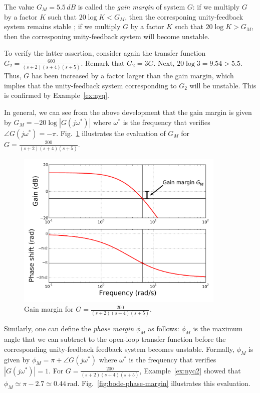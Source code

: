 \documentclass[a4paper,11pt]{report}
\theoremstyle{definition}
\begin{document}
The value $G_M=5.5\,dB$ is called the \emph{gain margin} of system
$G$: if we multiply $G$ by a factor $K$ such that $20\log K<G_M$, then
the corresponing unity-feedback system remains stable ; if we multiply
$G$ by a factor $K$ such that $20\log K>G_M$, then the corresponing
unity-feedback system will become unstable. 

To verify the latter assertion, consider again the transfer function
$G_2=\frac{600}{(s+2)(s+4)(s+5)}$. Remark that $G_2=3G$. Next, $20\log
3=9.54>5.5$. Thus, $G$ has been increased by a factor larger than the
gain margin, which implies that the unity-feedback system
corresponding to $G_2$ will be unstable. This is confirmed by
Example~\ref{ex:nyq}.

In general, we can see from the above development that the gain margin
is given by $G_M=-20\log|G(j\omega^*)|$ where $\omega^*$ is the
frequency that verifies $\angle
G(j\omega^*)=-\pi$. Fig.~\ref{fig:bode-gain-margin} illustrates the
evaluation of $G_M$ for $G=\frac{200}{(s+2)(s+4)(s+5)}$.
\begin{figure}[H]
  \centering
  \includegraphics[width=10cm]{fig/bode-gain-margin-mod.pdf}
  \caption{Gain margin for $G=\frac{200}{(s+2)(s+4)(s+5)}$.}
  \label{fig:bode-gain-margin}
\end{figure}

Similarly, one can define the \emph{phase margin} $\phi_M$ as follows:
$\phi_M$ is the maximum angle that we can subtract to the open-loop
transfer function before the corresponding unity-feedback feedback
system becomes unstable. Formally, $\phi_M$ is given by
$\phi_M=\pi+\angle G(j\omega^*)$ where $\omega^*$ is the frequency
that verifies $|G(j\omega^*)|=1$.  For
$G=\frac{200}{(s+2)(s+4)(s+5)}$, Example~\ref{ex:nyq2} showed that
$\phi_M\simeq\pi-2.7\simeq 0.44$\,rad. Fig.~\ref{fig:bode-phase-margin}
illustrates this evaluation.
\end{document}
